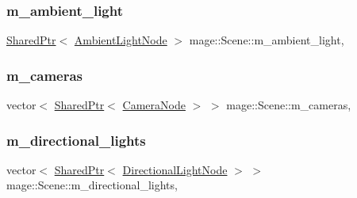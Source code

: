 \subsubsection{\texorpdfstring{m\+\_\+ambient\+\_\+light}{m\_ambient\_light}}
{\footnotesize\ttfamily \hyperlink{namespacemage_a1e01ae66713838a7a67d30e44c67703e}{Shared\+Ptr}$<$ \hyperlink{namespacemage_ab0783a7428706251f8561dc30a4d228d}{Ambient\+Light\+Node} $>$ mage\+::\+Scene\+::m\+\_\+ambient\+\_\+light\hspace{0.3cm}{\ttfamily [mutable]}, {\ttfamily [private]}}

\hypertarget{classmage_1_1_scene_a76fc089ae3185c82702d2ca42fd820e7}{}\label{classmage_1_1_scene_a76fc089ae3185c82702d2ca42fd820e7} 
\subsubsection{\texorpdfstring{m\+\_\+cameras}{m\_cameras}}
{\footnotesize\ttfamily vector$<$ \hyperlink{namespacemage_a1e01ae66713838a7a67d30e44c67703e}{Shared\+Ptr}$<$ \hyperlink{classmage_1_1_camera_node}{Camera\+Node} $>$ $>$ mage\+::\+Scene\+::m\+\_\+cameras\hspace{0.3cm}{\ttfamily [mutable]}, {\ttfamily [private]}}

\hypertarget{classmage_1_1_scene_a895f2ae809c17be09072f6bb89fd4e9c}{}\label{classmage_1_1_scene_a895f2ae809c17be09072f6bb89fd4e9c} 
\subsubsection{\texorpdfstring{m\+\_\+directional\+\_\+lights}{m\_directional\_lights}}
{\footnotesize\ttfamily vector$<$ \hyperlink{namespacemage_a1e01ae66713838a7a67d30e44c67703e}{Shared\+Ptr}$<$ \hyperlink{namespacemage_a7637b5351fc0f66a10badd80ebb35899}{Directional\+Light\+Node} $>$ $>$ mage\+::\+Scene\+::m\+\_\+directional\+\_\+lights\hspace{0.3cm}{\ttfamily [mutable]}, {\ttfamily [private]}}

\hypertarget{classmage_1_1_scene_a01132a667fbc1517f11ae561bc221071}{}\label{classmage_1_1_scene_a01132a667fbc1517f11ae561bc221071} 
